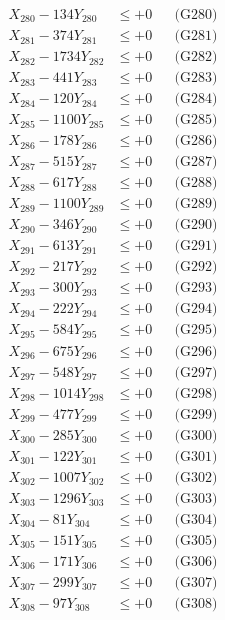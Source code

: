 \documentclass[a4paper,10pt]{article}
\begin{document}
{\begin{align}
X_{280} - 134Y_{280} &\leq +0 && \text{(G280)} \\
\allowbreak
X_{281} - 374Y_{281} &\leq +0 && \text{(G281)} \\
X_{282} - 1734Y_{282} &\leq +0 && \text{(G282)} \\
X_{283} - 441Y_{283} &\leq +0 && \text{(G283)} \\
X_{284} - 120Y_{284} &\leq +0 && \text{(G284)} \\
X_{285} - 1100Y_{285} &\leq +0 && \text{(G285)} \\
X_{286} - 178Y_{286} &\leq +0 && \text{(G286)} \\
X_{287} - 515Y_{287} &\leq +0 && \text{(G287)} \\
X_{288} - 617Y_{288} &\leq +0 && \text{(G288)} \\
X_{289} - 1100Y_{289} &\leq +0 && \text{(G289)} \\
X_{290} - 346Y_{290} &\leq +0 && \text{(G290)} \\
\allowbreak
X_{291} - 613Y_{291} &\leq +0 && \text{(G291)} \\
X_{292} - 217Y_{292} &\leq +0 && \text{(G292)} \\
X_{293} - 300Y_{293} &\leq +0 && \text{(G293)} \\
X_{294} - 222Y_{294} &\leq +0 && \text{(G294)} \\
X_{295} - 584Y_{295} &\leq +0 && \text{(G295)} \\
X_{296} - 675Y_{296} &\leq +0 && \text{(G296)} \\
X_{297} - 548Y_{297} &\leq +0 && \text{(G297)} \\
X_{298} - 1014Y_{298} &\leq +0 && \text{(G298)} \\
X_{299} - 477Y_{299} &\leq +0 && \text{(G299)} \\
X_{300} - 285Y_{300} &\leq +0 && \text{(G300)} \\
\allowbreak
X_{301} - 122Y_{301} &\leq +0 && \text{(G301)} \\
X_{302} - 1007Y_{302} &\leq +0 && \text{(G302)} \\
X_{303} - 1296Y_{303} &\leq +0 && \text{(G303)} \\
X_{304} - 81Y_{304} &\leq +0 && \text{(G304)} \\
X_{305} - 151Y_{305} &\leq +0 && \text{(G305)} \\
X_{306} - 171Y_{306} &\leq +0 && \text{(G306)} \\
X_{307} - 299Y_{307} &\leq +0 && \text{(G307)} \\
X_{308} - 97Y_{308} &\leq +0 && \text{(G308)} \\

\end{align}}
\end{document}
